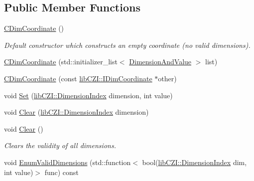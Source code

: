 \subsection*{Public Member Functions}
\begin{DoxyCompactItemize}
\item 
\mbox{\label{classlib_c_z_i_1_1_c_dim_coordinate_a51d381d8965a8d10c6d0295593bc3885}} 
\hyperlink{classlib_c_z_i_1_1_c_dim_coordinate_a51d381d8965a8d10c6d0295593bc3885}{C\+Dim\+Coordinate} ()
\begin{DoxyCompactList}\small\item\em Default constructor which constructs an empty coordinate (no valid dimensions). \end{DoxyCompactList}\item 
\hyperlink{classlib_c_z_i_1_1_c_dim_coordinate_a513ae54e9dc32c0c19040b94add75e80}{C\+Dim\+Coordinate} (std\+::initializer\+\_\+list$<$ \hyperlink{structlib_c_z_i_1_1_dimension_and_value}{Dimension\+And\+Value} $>$ list)
\item 
\hyperlink{classlib_c_z_i_1_1_c_dim_coordinate_a95be8c1ca51e6bf4e5efc4f23a027148}{C\+Dim\+Coordinate} (const \hyperlink{classlib_c_z_i_1_1_i_dim_coordinate}{lib\+C\+Z\+I\+::\+I\+Dim\+Coordinate} $\ast$other)
\item 
void \hyperlink{classlib_c_z_i_1_1_c_dim_coordinate_a9f6d967df6c2040e395c0710e8374909}{Set} (\hyperlink{namespacelib_c_z_i_a55049658acf59d0eddfaebcad16df424}{lib\+C\+Z\+I\+::\+Dimension\+Index} dimension, int value)
\item 
void \hyperlink{classlib_c_z_i_1_1_c_dim_coordinate_abfffd501e6cb4818a4b0454920b866ef}{Clear} (\hyperlink{namespacelib_c_z_i_a55049658acf59d0eddfaebcad16df424}{lib\+C\+Z\+I\+::\+Dimension\+Index} dimension)
\item 
\mbox{\label{classlib_c_z_i_1_1_c_dim_coordinate_ae1a5a2f981dff4c66edd2a4ef86829ef}} 
void \hyperlink{classlib_c_z_i_1_1_c_dim_coordinate_ae1a5a2f981dff4c66edd2a4ef86829ef}{Clear} ()
\begin{DoxyCompactList}\small\item\em Clears the validity of all dimensions. \end{DoxyCompactList}\item 
void \hyperlink{classlib_c_z_i_1_1_c_dim_coordinate_a65d3104fbc171cdab0cd53616df13f8e}{Enum\+Valid\+Dimensions} (std\+::function$<$ bool(\hyperlink{namespacelib_c_z_i_a55049658acf59d0eddfaebcad16df424}{lib\+C\+Z\+I\+::\+Dimension\+Index} dim, int value)$>$ func) const

\end{DoxyCompactItemize}
